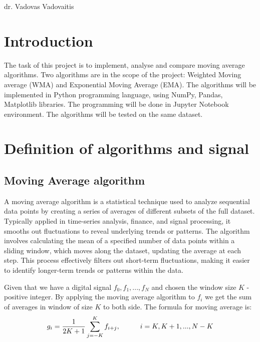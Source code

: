 \documentclass[a4paper,12pt,fleqn]{article}
\begin{document}
 {}{}{}{}%
{dr. Vadovas Vadovaitis}

\tableofcontents
\newpage


\section{Introduction}

\hspace{1em} The task of this project is to implement, analyse and compare moving average algorithms. Two algorithms
are in the scope of the project: Weighted Moving average (WMA) and Exponential Moving Average (EMA). The
algorithms will be implemented in Python programming language, using NumPy, Pandas, Matplotlib libraries. The
programming will be done in Jupyter Notebook environment. The algorithms will be tested on the same dataset.


\section{Definition of algorithms and signal}

\subsection{Moving Average algorithm}\label{MA}
\hspace{1em} A moving average algorithm is a statistical technique used to analyze sequential data points by creating 
a series of averages of different subsets of the full dataset. Typically applied in time-series analysis, 
finance, and signal processing, it smooths out fluctuations to reveal underlying trends or patterns. 
The algorithm involves calculating the mean of a specified number of data points within a sliding window,
which moves along the dataset, updating the average at each step. This process effectively filters out 
short-term fluctuations, making it easier to identify longer-term trends or patterns within the data.

Given that we have a digital signal \begin{math}
    f_0,f_1,...,f_N
\end{math} and chosen the window size \begin{math}
    K
    \end{math} - positive integer. By applying the moving average algorithm to \begin{math}
        f_i
    \end{math} we get the sum of averages in window of size \begin{math}
        K
    \end{math} to both side. The formula for moving average is:
    \begin{gather}\label{MA_equation}
        g_i = \frac{1}{2K+1} \sum_{j=-K}^{K} f_{i+j},\hspace{1 cm}i = K, K+1, ..., N-K
    \end{gather}
   
\end{document}
